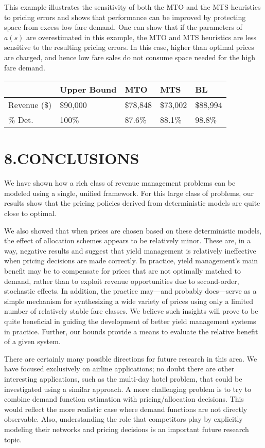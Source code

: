 This example illustrates the sensitivity of both the MTO and the MTS heuristics to pricing errors and shows that performance can be improved by protecting space from excess low fare demand. One can show that if the parameters of \(a(s)\) are overestimated in this example, the MTO and MTS heuristics are less sensitive to the resulting pricing errors. In this case, higher than optimal prices are charged, and hence low fare sales do not consume space needed for the high fare demand.

\begin{longtable}{|l|l|l|l|l|}
\hline
& \textbf{Upper Bound} & \textbf{MTO} & \textbf{MTS} & \textbf{BL} \\
\hline
Revenue (\$) & \$90,000 & \$78,848 & \$73,002 & \$88,994 \\
\hline
\% Det. & 100\% & 87.6\% & 88.1\% & 98.8\% \\
\hline
\end{longtable}

\section{8.CONCLUSIONS}\label{conclusions}

We have shown how a rich class of revenue management problems can be modeled using a single, unified framework. For this large class of problems, our results show that the pricing policies derived from deterministic models are quite close to optimal.

We also showed that when prices are chosen based on these deterministic models, the effect of allocation schemes appears to be relatively minor. These are, in a way, negative results and suggest that yield management is relatively ineffective when pricing decisions are made correctly. In practice, yield management's main benefit may be to compensate for prices that are not optimally matched to demand, rather than to exploit revenue opportunities due to second-order, stochastic effects. In addition, the practice may—and probably does—serve as a simple mechanism for synthesizing a wide variety of prices using only a limited number of relatively stable fare classes. We believe such insights will prove to be quite beneficial in guiding the development of better yield management systems in practice. Further, our bounds provide a means to evaluate the relative benefit of a given system.

There are certainly many possible directions for future research in this area. We have focused exclusively on airline applications; no doubt there are other interesting applications, such as the multi-day hotel problem, that could be investigated using a similar approach. A more challenging problem is to try to combine demand function estimation with pricing/allocation decisions. This would reflect the more realistic case where demand functions are not directly observable. Also, understanding the role that competitors play by explicitly modeling their networks and pricing decisions is an important future research topic.

